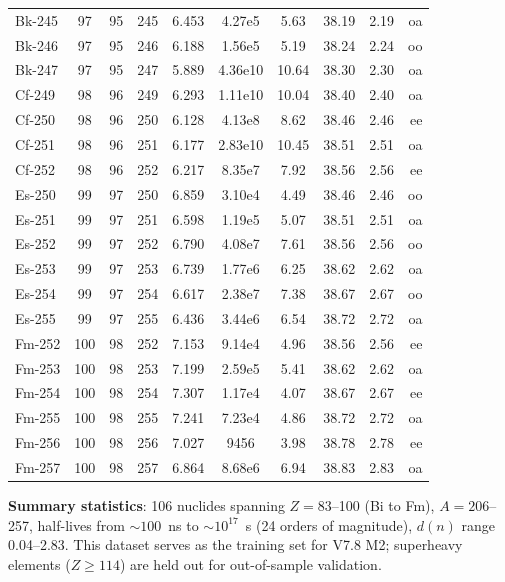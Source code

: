 \begin{longtable}{lccccccccr}
Bk-245 & 97 & 95 & 245 & 6.453 & 4.27e5 & 5.63 & 38.19 & 2.19 & oa \\
Bk-246 & 97 & 95 & 246 & 6.188 & 1.56e5 & 5.19 & 38.24 & 2.24 & oo \\
Bk-247 & 97 & 95 & 247 & 5.889 & 4.36e10 & 10.64 & 38.30 & 2.30 & oa \\
Cf-249 & 98 & 96 & 249 & 6.293 & 1.11e10 & 10.04 & 38.40 & 2.40 & oa \\
Cf-250 & 98 & 96 & 250 & 6.128 & 4.13e8 & 8.62 & 38.46 & 2.46 & ee \\
Cf-251 & 98 & 96 & 251 & 6.177 & 2.83e10 & 10.45 & 38.51 & 2.51 & oa \\
Cf-252 & 98 & 96 & 252 & 6.217 & 8.35e7 & 7.92 & 38.56 & 2.56 & ee \\
Es-250 & 99 & 97 & 250 & 6.859 & 3.10e4 & 4.49 & 38.46 & 2.46 & oo \\
Es-251 & 99 & 97 & 251 & 6.598 & 1.19e5 & 5.07 & 38.51 & 2.51 & oa \\
Es-252 & 99 & 97 & 252 & 6.790 & 4.08e7 & 7.61 & 38.56 & 2.56 & oo \\
Es-253 & 99 & 97 & 253 & 6.739 & 1.77e6 & 6.25 & 38.62 & 2.62 & oa \\
Es-254 & 99 & 97 & 254 & 6.617 & 2.38e7 & 7.38 & 38.67 & 2.67 & oo \\
Es-255 & 99 & 97 & 255 & 6.436 & 3.44e6 & 6.54 & 38.72 & 2.72 & oa \\
Fm-252 & 100 & 98 & 252 & 7.153 & 9.14e4 & 4.96 & 38.56 & 2.56 & ee \\
Fm-253 & 100 & 98 & 253 & 7.199 & 2.59e5 & 5.41 & 38.62 & 2.62 & oa \\
Fm-254 & 100 & 98 & 254 & 7.307 & 1.17e4 & 4.07 & 38.67 & 2.67 & ee \\
Fm-255 & 100 & 98 & 255 & 7.241 & 7.23e4 & 4.86 & 38.72 & 2.72 & oa \\
Fm-256 & 100 & 98 & 256 & 7.027 & 9456 & 3.98 & 38.78 & 2.78 & ee \\
Fm-257 & 100 & 98 & 257 & 6.864 & 8.68e6 & 6.94 & 38.83 & 2.83 & oa \\
\end{longtable}
\normalsize

\textbf{Summary statistics}: 106 nuclides spanning $Z = 83$--100 (Bi to Fm), $A = 206$--257, half-lives from $\sim 100$~ns to $\sim 10^{17}$~s (24 orders of magnitude), $d(n)$ range 0.04--2.83. This dataset serves as the training set for V7.8 M2; superheavy elements ($Z \geq 114$) are held out for out-of-sample validation.

